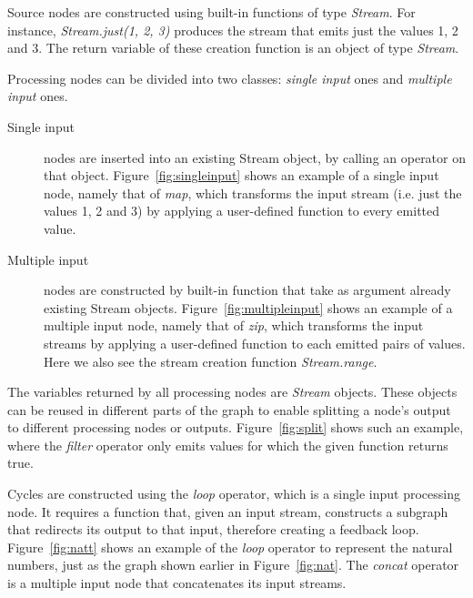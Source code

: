 \documentclass[sigplan,review,anonymous,screen]{acmart}
\begin{document}
Source nodes are constructed using built-in functions of type \textit{Stream}.
For instance, \textit{Stream.just(1, 2, 3)} produces the stream that emits just
the values 1, 2 and 3. The return variable of these creation function is an
object of type \textit{Stream}.

Processing nodes can be divided into two classes: \textit{single input} ones and
\textit{multiple input} ones.
%
\begin{description}
\item[Single input] nodes are inserted into an existing Stream object, by
calling an operator on that object. Figure~\ref{fig:singleinput} shows an
example of a single input node, namely that of \textit{map}, which transforms
the input stream (i.e. just the values 1, 2 and 3) by applying a user-defined
function to every emitted value.
%
%
\item[Multiple input] nodes are constructed by built-in function that take as
argument already existing Stream objects. Figure~\ref{fig:multipleinput} shows
an example of a multiple input node, namely that of \textit{zip}, which
transforms the input streams by
applying a user-defined function to each emitted pairs of values.
Here we also see the stream creation function \textit{Stream.range}.
%
%
\end{description}

The variables returned by all processing nodes are \textit{Stream} objects. These
objects can be reused in different parts of the graph to enable splitting a
node's output to different processing nodes or outputs. Figure~\ref{fig:split}
shows such an example, where the \textit{filter} operator only emits values for
which the given function returns true.


Cycles are constructed using the \textit{loop} operator, which is a single
input processing node. It requires a function that, given an input stream,
constructs a subgraph that redirects its output to that input, therefore
creating a feedback loop. Figure~\ref{fig:natt} shows an example of the
\textit{loop} operator to represent the natural numbers, just as the graph
shown earlier in Figure~\ref{fig:nat}. The \textit{concat} operator is a
multiple input node that concatenates its input streams.
\end{document}
